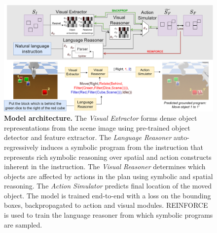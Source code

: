 \begin{figure}
    \centering    
    \includegraphics[width=16cm]{figures/main-model-3.png}
    
    \caption{
    \footnotesize{
    \textbf{Model architecture.} 
    The \emph{Visual Extractor} forms dense object representations from the scene image using pre-trained object detector and feature extractor.  
    The \emph{Language Reasoner} auto-regressively induces a symbolic program  from the instruction that represents rich symbolic reasoning over spatial and action constructs inherent in the instruction.  
    The \emph{Visual Reasoner} determines which objects are affected by actions in the plan using symbolic and spatial reasoning.  
    The \emph{Action Simulator} predicts final location of the moved object. 
    The model is trained end-to-end with a loss on the bounding boxes, 
    backpropagated to action and visual modules. REINFORCE is used to train \cite{williams1987class} the language reasoner from which symbolic programs are sampled.     }
    \vspace{-0.5cm}}
    

\end{figure}
